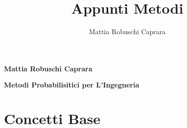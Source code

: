 \documentclass{article}
\title{Appunti Metodi}
\author{Mattia Robuschi Caprara}
\date{}
\begin{document}
\begin{titlepage}

\pagecolor{CoverGreen}

\vspace{25 mm}
\begin{center}
    \large
    {\color{white}\textbf{Mattia Robuschi Caprara}} 
\end{center}

\begin{center}
    \huge
    {\color{white}\textbf{Metodi Probabilisitici per L'Ingegneria}}
\end{center}

\vspace{25 mm}

\begin{figure}[ht]
    \centering
\end{figure}

\thispagestyle{empty} 
\end{titlepage}

\newpage
\pagecolor{white}
\tableofcontents
\newpage

\section{Concetti Base}
\end{document}
